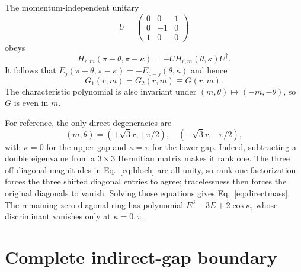 \documentclass[aps,prb,preprint,superscriptaddress,nofootinbib]{revtex4-2}
\begin{document}
The momentum-independent unitary
\begin{equation}
U=\begin{pmatrix}0&0&1\\0&-1&0\\1&0&0\end{pmatrix}
\end{equation}
obeys
\begin{equation}
H_{r,m}(\pi-\theta,\pi-\kappa)
=-U H_{r,m}(\theta,\kappa)U^\dagger.
\label{eq:spectralreflection}
\end{equation}
It follows that
$E_j(\pi-\theta,\pi-\kappa)=-E_{4-j}(\theta,\kappa)$ and hence
\begin{equation}
\boxed{G_1(r,m)=G_2(r,m)\equiv G(r,m).}
\label{eq:gapequality}
\end{equation}
The characteristic polynomial is also invariant under
$(m,\theta)\mapsto(-m,-\theta)$, so $G$ is even in $m$.

For reference, the only direct degeneracies are
\begin{equation}
(m,\theta)=(+\sqrt3r,+\pi/2),\quad
(-\sqrt3r,-\pi/2),
\label{eq:directmass}
\end{equation}
with $\kappa=0$ for the upper gap and $\kappa=\pi$ for the lower gap.
Indeed, subtracting a double eigenvalue from a $3\times3$ Hermitian matrix
makes it rank one.  The three off-diagonal magnitudes in Eq.~\eqref{eq:bloch}
are all unity, so rank-one factorization forces the three shifted diagonal
entries to agree; tracelessness then forces the original diagonals to vanish.
Solving those equations gives Eq.~\eqref{eq:directmass}.  The remaining
zero-diagonal ring has polynomial $E^3-3E+2\cos\kappa$, whose discriminant
vanishes only at $\kappa=0,\pi$.

\section{Complete indirect-gap boundary}
\label{sec:result}
\end{document}
